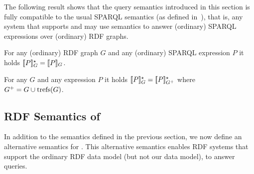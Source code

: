 \noindent
{}

The following result shows that the query semantics introduced in this section is fully compatible to the usual SPARQL semantics (as defined in~\cite{Perez09:SemanticsAndComplexityOfSPARQL}), that is, any system that supports {\RDFplus}
	and {\SPARQLplus}
may use {\SPARQLplus} semantics to answer (ordinary) SPARQL expressions over (ordinary) RDF graphs.

\begin{proposition} \label{Proposition:EquivalenceOfSemantics}
	For any (ordinary) RDF graph $G$ and any (ordinary) SPARQL expression $P$ it holds $[\![P]\!]^\star_{G} = [\![P]\!]_{G}$.
\end{proposition}


\begin{proposition}
	For any {\RDFplusGraph} $G$ and any {\SPARQLplus} expression $P$ it holds $[\![P]\!]^\star_{G} = [\![P]\!]^\star_{G^+}$ where $G^+ = G \cup \mathrm{trefs}(G)$.
\end{proposition}



\subsection{RDF Semantics of {\SPARQLplus}}
	In addition to the {\SPARQLplus} semantics defined in the previous section, we now define an alternative semantics for {\SPARQLplus}. This alternative semantics enables RDF systems that support the ordinary RDF data model (but not our {\RDFplus} data model), to answer {\SPARQLplus} queries.


